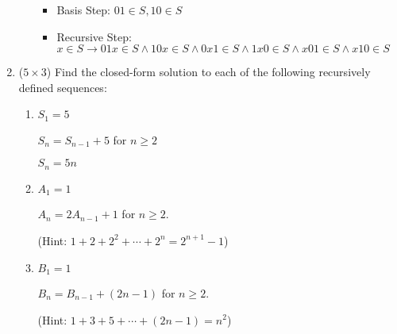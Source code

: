 \documentclass[12pt]{article}
\begin{document}
\begin{enumerate}
\begin{enumerate}
		\begin{itemize}
			\item Basis Step: $01 \in S, 10 \in S$
			\item Recursive Step: $x \in S \to 01x \in S \land 10x \in S \land 0x1 \in S \land 1x0 \in S \land x01 \in S \land x10 \in S$
		\end{itemize}
	\end{enumerate}

		\newpage
	\item ($5 \times 3$)
    Find the closed-form solution to each of the following recursively defined sequences:
	\begin{enumerate}
		\item
		$S_1 = 5$

		$S_n = S_{n-1} + 5$ for $n \geq 2$

		$S_n = 5n$
		\item
		$A_1 = 1$

		$A_n = 2A_{n-1} + 1$ for $n \geq 2$.

        (Hint: $1 + 2 + 2^2 + \cdots + 2^n = 2^{n+1} - 1$)
		\item
		$B_1 = 1$

		$B_n = B_{n-1} + (2n - 1)$ for $n \geq 2$.

		(Hint: $1 + 3 + 5 + \cdots + (2n - 1) = n^2$)
	\end{enumerate}

\end{enumerate}
\end{document}

